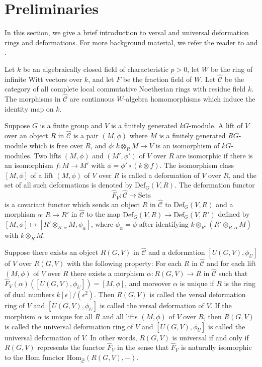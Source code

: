 \documentclass{amsart}
\theoremstyle{plain}
\theoremstyle{definition}
\theoremstyle{remark}
\begin{document}
\section{Preliminaries}
\label{s:prelim}
\setcounter{equation}{0}
\setcounter{figure}{0}

In this section, we give a brief introduction to versal and universal deformation rings and deformations. 
For more background material, we refer the reader to \cite{maz1} and \cite{lendesmit}.

Let $k$ be an algebraically closed field of characteristic $p>0$, let $W$ be the ring of infinite Witt 
vectors over $k$, and let $F$ be the fraction field of $W$. 
Let $\hat{\mathcal{C}}$ be the category of all complete local commutative Noetherian 
rings with residue field $k$. The morphisms in $\hat{\mathcal{C}}$ are continuous $W$-algebra 
homomorphisms which induce the identity map on $k$. 

Suppose $G$ is a finite group and $V$ is a finitely generated $kG$-module. 
A lift of $V$ over an object $R$ in $\hat{\mathcal{C}}$ is a pair $(M,\phi)$ where $M$ is a finitely 
generated $RG$-module which is free over $R$, and $\phi:k\otimes_R M\to V$ is an isomorphism of 
$kG$-modules. Two lifts $(M,\phi)$ and $(M',\phi')$ of $V$ over $R$ are isomorphic if there is an 
isomorphism $f:M\to M'$ with $\phi=\phi'\circ (k\otimes f)$. The isomorphism class $[M,\phi]$ of a lift 
$(M,\phi)$ of $V$ over $R$ is called a deformation of $V$ over $R$, and the set of all such deformations 
is denoted by $\mathrm{Def}_G(V,R)$. The deformation functor
$$\hat{F}_V:\hat{\mathcal{C}} \to \mathrm{Sets}$$ 
is a covariant functor which
sends an object $R$ in $\hat{\mathcal{C}}$ to $\mathrm{Def}_G(V,R)$ and a morphism 
$\alpha:R\to R'$ in $\hat{\mathcal{C}}$ to the map $\mathrm{Def}_G(V,R) \to
\mathrm{Def}_G(V,R')$ defined by $[M,\phi]\mapsto [R'\otimes_{R,\alpha} M,\phi_\alpha]$, where  
$\phi_\alpha=\phi$ after identifying $k\otimes_{R'}(R'\otimes_{R,\alpha} M)$ with $k\otimes_R M$.

Suppose there exists an object $R(G,V)$ in $\hat{\mathcal{C}}$ and a deformation 
$[U(G,V),\phi_U]$ of $V$ over $R(G,V)$ with the following property:
For each $R$ in $\hat{\mathcal{C}}$ and for each lift $(M,\phi)$ of $V$ over $R$ there exists 
a morphism $\alpha:R(G,V)\to R$ in $\hat{\mathcal{C}}$ such that $\hat{F}_V(\alpha)([U(G,V),\phi_U])=
[M,\phi]$, and moreover $\alpha$ is unique if $R$ is the ring of dual numbers
$k[\epsilon]/(\epsilon^2)$. Then $R(G,V)$ is called the versal deformation ring of $V$ and 
$[U(G,V),\phi_U]$ is called the versal deformation of $V$. If the morphism $\alpha$ is
unique for all $R$ and all lifts $(M,\phi)$ of $V$ over $R$, 
then $R(G,V)$ is called the universal deformation ring of $V$ and $[U(G,V),\phi_U]$ is 
called the universal deformation of $V$. In other words, $R(G,V)$ is universal if and only if
$R(G,V)$ represents the functor $\hat{F}_V$ in the sense that $\hat{F}_V$ is naturally isomorphic to 
the Hom functor
$\mathrm{Hom}_{\hat{\mathcal{C}}}(R(G,V),-)$. 
\end{document}
